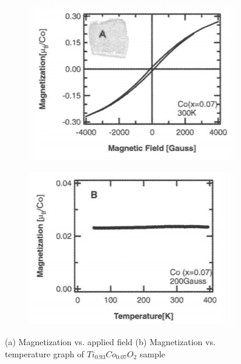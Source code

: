\documentclass[main.tex]{subfiles}
\begin{document}
\begin{figure}[!htb]
\centering
	\begin{subfigure}[h]{0.45\textwidth}
		\centering
		\includegraphics[width=\linewidth]{matsumo1}
  		\caption{}
	\end{subfigure}
	\begin{subfigure}[h]{0.47\textwidth}
  		\centering
  		\includegraphics[width=\linewidth]{matsumo2}
  		\caption{}
	\end{subfigure}
\caption{(a) Magnetization vs. applied field (b) Magnetization vs. temperature graph of $Ti_{0.93}Co_{0.07}O_{2}$ sample \cite{matsumoto2001room}} 
\label{fig:fig}

\end{figure}
\FloatBarrier
\end{document}
